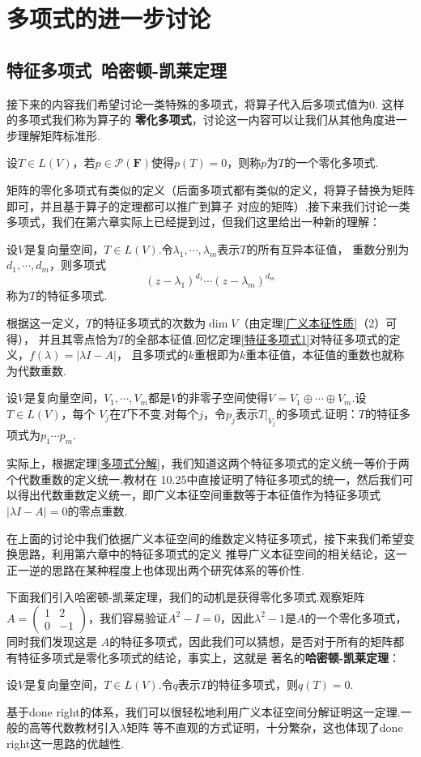 \chapter{多项式的进一步讨论}

\section{特征多项式\ 哈密顿-凯莱定理}
接下来的内容我们希望讨论一类特殊的多项式，将算子代入后多项式值为0. 这样的多项式我们称为算子的
\textbf{零化多项式}，讨论这一内容可以让我们从其他角度进一步理解矩阵标准形.
\begin{definition}
	设$T\in L(V)$，若$p\in\mathcal{P}(\mathbf{F})$使得$p(T)=0$，则称$p$为$T$的一个零化多项式.
\end{definition}
矩阵的零化多项式有类似的定义（后面多项式都有类似的定义，将算子替换为矩阵即可，并且基于算子的定理都可以推广到算子
对应的矩阵）.接下来我们讨论一类多项式，我们在第六章实际上已经提到过，但我们这里给出一种新的理解：
\begin{definition}
	设$V$是复向量空间，$T\in L(V)$.令$\lambda_1,\cdots,\lambda_m$表示$T$的所有互异本征值，
	重数分别为$d_1,\cdots,d_m$，则多项式$$(z-\lambda_1)^{d_1}\cdots(z-\lambda_m)^{d_m}$$
	称为$T$的特征多项式.
\end{definition}
根据这一定义，$T$的特征多项式的次数为$\dim V$（由定理\ref{广义本征性质}（2）可得），
并且其零点恰为$T$的全部本征值.回忆定理\ref{特征多项式1}对特征多项式的定义，$f(\lambda)=|\lambda I-A|$，
且多项式的$k$重根即为$k$重本征值，本征值的重数也就称为代数重数.
\begin{example}
	设$V$是复向量空间，$V_1,\cdots,V_m$都是$V$的非零子空间使得$V=V_1\oplus\cdots\oplus V_m$.设$T\in L(V)$，每个
	$V_j$在$T$下不变.对每个$j$，令$p_j$表示$T|_{V_j}$的多项式.证明：$T$的特征多项式为$p_1\cdots p_m$.
\end{example}
实际上，根据定理\ref{多项式分解}，我们知道这两个特征多项式的定义统一等价于两个代数重数的定义统一.教材在
10.25中直接证明了特征多项式的统一，然后我们可以得出代数重数定义统一，即广义本征空间重数等于本征值作为特征多项式
$|\lambda I-A|=0$的零点重数.

在上面的讨论中我们依据广义本征空间的维数定义特征多项式，接下来我们希望变换思路，利用第六章中的特征多项式的定义
推导广义本征空间的相关结论，这一正一逆的思路在某种程度上也体现出两个研究体系的等价性.

下面我们引入哈密顿-凯莱定理，我们的动机是获得零化多项式.观察矩阵$A=\begin{pmatrix}
	1 & 2 \\ 0 & -1
\end{pmatrix}$，我们容易验证$A^2-I=0$，因此$\lambda^2-1$是$A$的一个零化多项式，同时我们发现这是
$A$的特征多项式，因此我们可以猜想，是否对于所有的矩阵都有特征多项式是零化多项式的结论，事实上，这就是
著名的\textbf{哈密顿-凯莱定理}：
\begin{theorem}
	设$V$是复向量空间，$T\in L(V)$.令$q$表示$T$的特征多项式，则$q(T)=0$.
\end{theorem}
基于done right的体系，我们可以很轻松地利用广义本征空间分解证明这一定理.一般的高等代数教材引入$\lambda$矩阵
等不直观的方式证明，十分繁杂，这也体现了done right这一思路的优越性.

